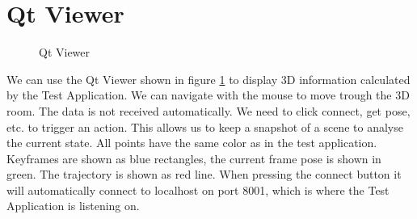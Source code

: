 \documentclass[11pt,a4paper,titlepage,oneside]{report}
\begin{document}
\section{Qt Viewer}
\begin{figure}[H]
  \centering
  \qquad
  \caption{Qt Viewer}\label{fig:qt_viewer}
\end{figure}

We can use the Qt Viewer shown in figure \ref{fig:qt_viewer} to display 3D information calculated by the Test Application. We can navigate with the mouse to move trough the 3D room. The data is not received automatically. We need to click connect, get pose, etc. to trigger an action. This allows us to keep a snapshot of a scene to analyse the current state. All points have the same color as in the test application. Keyframes are shown as blue rectangles, the current frame pose is shown in green. The trajectory is shown as red line. When pressing the connect button it will automatically connect to localhost on port 8001, which is where the Test Application is listening on.
\end{document}
